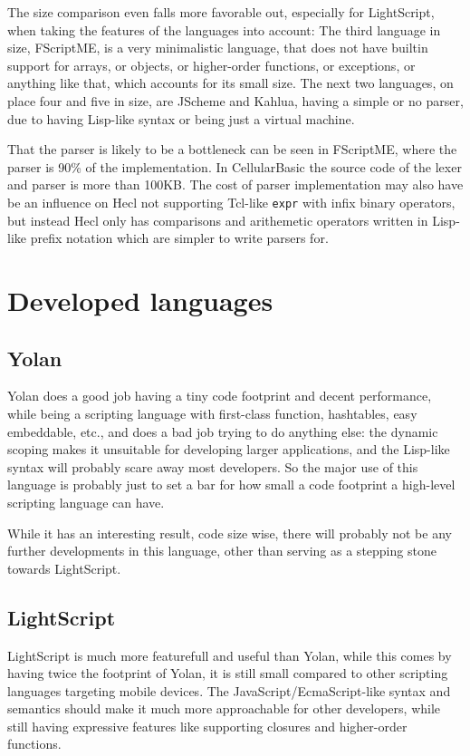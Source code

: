\documentclass[11pt]{report}
\begin{document}
The size comparison even falls more favorable out, especially for LightScript, when taking the features of the languages into account:
The third language in size, FScriptME, is a very minimalistic language, that does not have builtin support for arrays, or objects, or higher-order functions, or exceptions, or anything like that, which accounts for its small size.
The next two languages, on place four and five in size, are JScheme and Kahlua,
having a simple or no parser, due to having Lisp-like syntax or being just a virtual machine.

That the parser is likely to be a bottleneck can be seen in FScriptME, where the parser is 90\% of the implementation. In CellularBasic the source code of the lexer and parser is more than 100KB. 
The cost of parser implementation may also have be an influence on Hecl not supporting Tcl-like \verb|expr| with infix binary operators, but instead Hecl only has comparisons and arithemetic operators written in Lisp-like prefix notation which are simpler to write parsers for.

\section{Developed languages}
\subsection{Yolan}
Yolan does a good job having a tiny code footprint and decent performance, while being a scripting language with first-class function, hashtables, easy embeddable, etc., and does a bad job trying to do anything else:
the dynamic scoping makes it unsuitable for developing larger applications, and the Lisp-like syntax will probably scare away most developers.
So the major use of this language is probably just to set a bar for how small a code footprint a high-level scripting language can have.

While it has an interesting result, code size wise, there will probably not be any further developments in this language, other than serving as a stepping stone towards LightScript.

\subsection{LightScript}
LightScript is much more featurefull and useful than Yolan, while this comes by having twice the footprint of Yolan, it is still small compared to other scripting languages targeting mobile devices. 
The JavaScript/EcmaScript-like syntax and semantics should make it much more approachable for other developers, while still having expressive features like supporting closures and higher-order functions.
\end{document}
